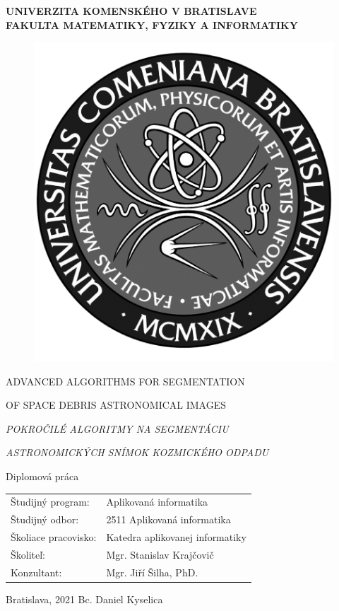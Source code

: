 \thispagestyle{empty}

\noindent
\begin{minipage}{\textwidth}
\begin{center}
\textbf{UNIVERZITA KOMENSKÉHO V BRATISLAVE \\ FAKULTA MATEMATIKY, FYZIKY A INFORMATIKY}
\end{center}
\end{minipage}

\vfill
\begin{figure}[!hbt]
\begin{center}
\includegraphics{front_pages/images/logo_fmph_dark}
\label{img:logo_dark}
\end{center}
\end{figure}
\begin{center}
\begin{minipage}{0.8\textwidth}
		\centerline{\Large\MakeUppercase{Advanced algorithms for segmentation}}
		\centerline{\Large\MakeUppercase{of space debris astronomical images}}
		\centerline{\Large\MakeUppercase{}}
		\centerline{\Large\MakeUppercase{\textit{Pokročilé algoritmy na segmentáciu}}} \centerline{\Large\MakeUppercase{\textit{astronomických snímok kozmického odpadu}}}
\smallskip
\centerline{Diplomová práca}
\end{minipage}
\end{center}
\vfill
\begin{tabular}{l l}
Študijný program: & Aplikovaná informatika\\
Študijný odbor: & 2511 Aplikovaná informatika\\
Školiace pracovisko: & Katedra aplikovanej informatiky\\
Školiteľ: & Mgr. Stanislav Krajčovič\\
Konzultant: & Mgr. Jiří Šilha, PhD.\\
\end{tabular}
\vfill
\noindent
Bratislava, 2021 \hfill
Bc. Daniel Kyselica
\eject 